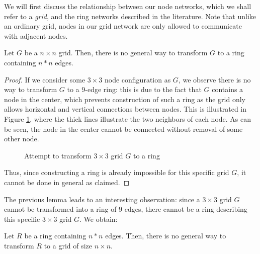 We will first discuss the relationship between our node networks, which we shall refer to a \emph{grid}, and the ring networks described in the literature. Note that unlike an ordinary grid, nodes in our grid network are only allowed to communicate with adjacent nodes.
\\
\begin{lemma} \label{lemma:grid2ring}
Let $G$ be a $n \times n$ grid. Then, there is no general way to transform $G$ to a ring containing $n*n$ edges.
\end{lemma} 
\begin{proof}
If we consider some $3 \times 3$ node configuration as $G$, we observe there is no way to transform $G$ to a $9$-edge ring: this is due to the fact that $G$ contains a node in the center, which prevents construction of such a ring as the grid only allows horizontal and vertical connections between nodes. This is illustrated in Figure \ref{fig:gridnode}, where the thick lines illustrate the two neighbors of each node. As can be seen, the node in the center cannot be connected without removal of some other node.

\begin{figure}[h]
\centering
{}
\caption{\label{fig:gridnode} Attempt to transform $3 \times 3$ grid $G$ to a ring}
\end{figure}

Thus, since constructing a ring is already impossible for this specific grid $G$, it cannot be done in general as claimed.
\end{proof}

The previous lemma leads to an interesting observation: since a $3 \times 3$ grid $G$ cannot be transformed into a ring of $9$ edges, there cannot be a ring describing this specific $3 \times 3$ grid $G$. We obtain:
\\
\begin{corollary} \label{col:ring2grid}
Let $R$ be a ring containing $n * n$ edges. Then, there is no general way to transform $R$ to a grid of size $n \times n$.
\end{corollary}

